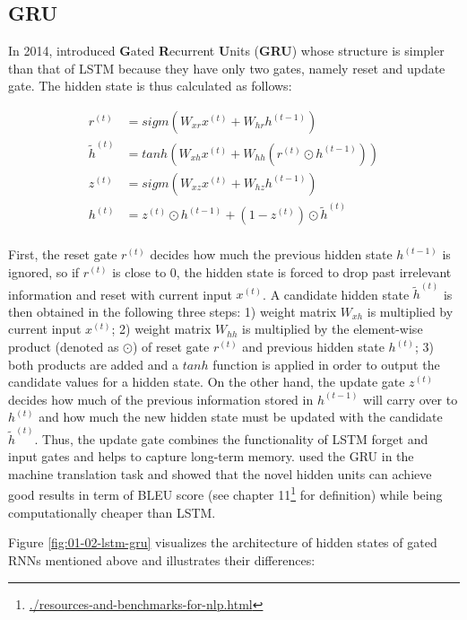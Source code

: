 \documentclass[]{krantz}
\renewcommand{\href}[2]{#2\footnote{\url{#1}}}
\begin{document}
\hypertarget{gru}{%
\subsection{GRU}\label{gru}}

In 2014, \citet{cho2014learning} introduced \textbf{G}ated \textbf{R}ecurrent \textbf{U}nits (\textbf{GRU}) whose structure is simpler than that of LSTM because they have only two gates, namely reset and update gate.
The hidden state is thus calculated as follows:

\begin{align}
r^{(t)} & = sigm(W_{xr}x^{(t)}+W_{hr}h^{(t-1)}) \label{eq:gru-reset} \\
\tilde{h}^{(t)} & = tanh(W_{xh}x^{(t)}+W_{hh}(r^{(t)} \odot h^{(t-1)})) \label{eq:gru-hidden} \\
z^{(t)} & = sigm(W_{xz}x^{(t)}+W_{hz}h^{(t-1)}) \label{eq:gru-update} \\
h^{(t)} & = z^{(t)}\odot h^{(t-1)}+(1-z^{(t)})\odot \tilde{h}^{(t)} \label{eq:gru-hidden-output} \\
\end{align}

First, the reset gate \(r^{(t)}\) decides how much the previous hidden state \(h^{(t-1)}\) is ignored, so if \(r^{(t)}\) is close to \(0\), the hidden state is forced to drop past irrelevant information and reset with current input \(x^{(t)}\). A candidate hidden state \(\tilde{h}^{(t)}\) is then obtained in the following three steps: 1) weight matrix \(W_{xh}\) is multiplied by current input \(x^{(t)}\); 2) weight matrix \(W_{hh}\) is multiplied by the element-wise product (denoted as \(\odot\)) of reset gate \(r^{(t)}\) and previous hidden state \(h^{(t)}\); 3) both products are added and a \(tanh\) function is applied in order to output the candidate values for a hidden state.
On the other hand, the update gate \(z^{(t)}\) decides how much of the previous information stored in \(h^{(t-1)}\) will carry over to \(h^{(t)}\) and how much the new hidden state must be updated with the candidate \(\tilde{h}^{(t)}\). Thus, the update gate combines the functionality of LSTM forget and input gates and helps to capture long-term memory. \citet{cho2014learning} used the GRU in the machine translation task and showed that the novel hidden units can achieve good results in term of BLEU score (see chapter \href{./resources-and-benchmarks-for-nlp.html}{11} for definition) while being computationally cheaper than LSTM.

Figure \ref{fig:01-02-lstm-gru} visualizes the architecture of hidden states of gated RNNs mentioned above and illustrates their differences:
\end{document}
